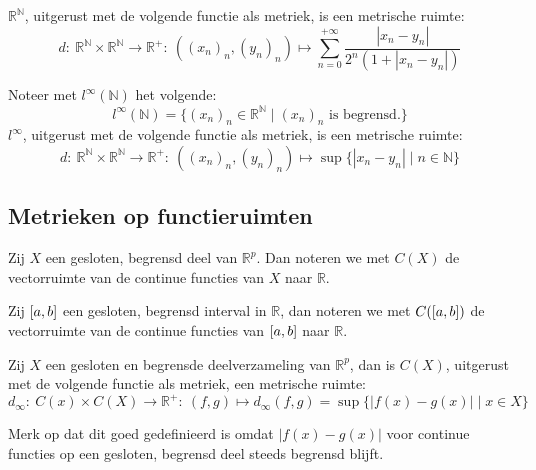 \documentclass[main.tex]{subfiles}
\begin{document}
\begin{vb}
  $\mathbb{R}^{\mathbb{N}}$, uitgerust met de volgende functie als metriek, is een metrische ruimte:
  \[ d:\ \mathbb{R}^{\mathbb{N}} \times \mathbb{R}^{\mathbb{N}} \rightarrow \mathbb{R}^{+}:\ ((x_{n})_{n},(y_{n})_{n}) \mapsto \sum_{n=0}^{+\infty}\frac{|x_{n}-y_{n}|}{2^{n}(1+|x_{n}-y_{n}|)} \]
\end{vb}

\begin{vb}
  Noteer met $l^{\infty}(\mathbb{N})$ het volgende:
  \[ l^{\infty}(\mathbb{N}) = \{ (x_{n})_{n} \in \mathbb{R}^{\mathbb{N}} \mid (x_{n})_{n} \text{ is begrensd.}\} \]
  $l^{\infty}$, uitgerust met de volgende functie als metriek, is een metrische ruimte:
  \[ d:\ \mathbb{R}^{\mathbb{N}} \times \mathbb{R}^{\mathbb{N}} \rightarrow \mathbb{R}^{+}:\ ((x_{n})_{n},(y_{n})_{n}) \mapsto \sup\{|x_{n}-y_{n}| \mid n\in \mathbb{N}\} \]
\end{vb}

\subsection{Metrieken op functieruimten}
\label{sec:metr-op-funct}

\begin{de}
  Zij $X$ een gesloten, begrensd deel van $\mathbb{R}^{p}$. Dan noteren we met $C(X)$ de vectorruimte van de continue functies van $X$ naar $\mathbb{R}$.
\end{de}

\begin{de}
  Zij $\interval{a}{b}$ een gesloten, begrensd interval in $\mathbb{R}$, dan noteren we met $C(\interval{a}{b})$ de vectorruimte van de continue functies van $\interval{a}{b}$ naar $\mathbb{R}$.
\end{de}

\begin{vb}
  Zij $X$ een gesloten en begrensde deelverzameling van $\mathbb{R}^{p}$, dan is $C(X)$, uitgerust met de volgende functie als metriek, een metrische ruimte:
  \[ d_{\infty}:\ C(x)\times C(X)\rightarrow \mathbb{R}^{+}:\ (f,g) \mapsto d_{\infty}(f,g) = \sup \{ |f(x)-g(x)| \mid x \in X \} \]

\end{vb}

\begin{opm}
  Merk op dat dit goed gedefinieerd is omdat $|f(x)-g(x)|$ voor continue functies op een gesloten, begrensd deel steeds begrensd blijft. \needed
\end{opm}
\end{document}
